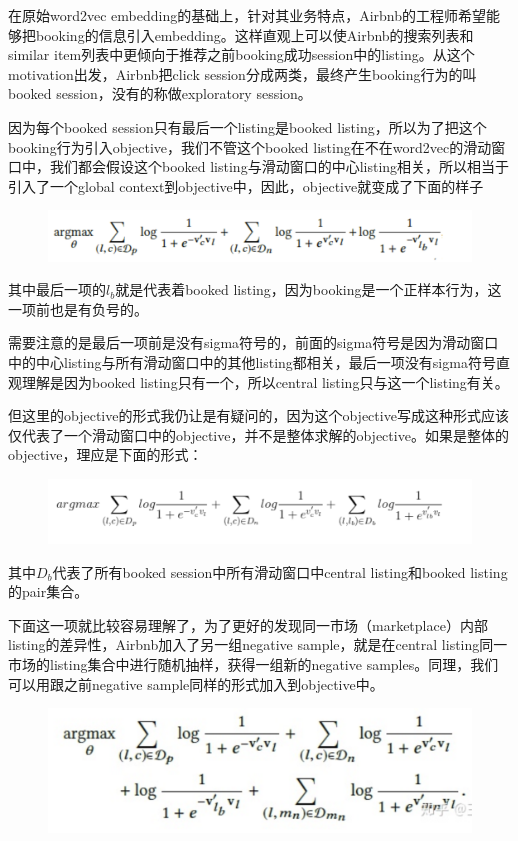 \documentclass[12pt]{article}
\begin{document}
在原始word2vec embedding的基础上，针对其业务特点，Airbnb的工程师希望能够把booking的信息引入embedding。这样直观上可以使Airbnb的搜索列表和similar item列表中更倾向于推荐之前booking成功session中的listing。从这个motivation出发，Airbnb把click session分成两类，最终产生booking行为的叫booked session，没有的称做exploratory session。

因为每个booked session只有最后一个listing是booked listing，所以为了把这个booking行为引入objective，我们不管这个booked listing在不在word2vec的滑动窗口中，我们都会假设这个booked listing与滑动窗口的中心listing相关，所以相当于引入了一个global context到objective中，因此，objective就变成了下面的样子
\begin{figure}[H]
    \centering
    \includegraphics[width=1\textwidth]{fig/Airbnb_Click_Objetive2.png}
\end{figure}

其中最后一项的$l_b$就是代表着booked listing，因为booking是一个正样本行为，这一项前也是有负号的。

需要注意的是最后一项前是没有sigma符号的，前面的sigma符号是因为滑动窗口中的中心listing与所有滑动窗口中的其他listing都相关，最后一项没有sigma符号直观理解是因为booked listing只有一个，所以central listing只与这一个listing有关。

但这里的objective的形式我仍让是有疑问的，因为这个objective写成这种形式应该仅代表了一个滑动窗口中的objective，并不是整体求解的objective。如果是整体的objective，理应是下面的形式：
\begin{figure}[H]
    \centering
    \includegraphics[width=1\textwidth]{fig/Airbnb_Click_Objetive3.png}
\end{figure}

其中$D_b$代表了所有booked session中所有滑动窗口中central listing和booked listing的pair集合。

下面这一项就比较容易理解了，为了更好的发现同一市场（marketplace）内部listing的差异性，Airbnb加入了另一组negative sample，就是在central listing同一市场的listing集合中进行随机抽样，获得一组新的negative samples。同理，我们可以用跟之前negative sample同样的形式加入到objective中。
\begin{figure}[H]
    \centering
    \includegraphics[width=1\textwidth]{fig/Airbnb_Click_Objetive4.png}
\end{figure}
\end{document}
